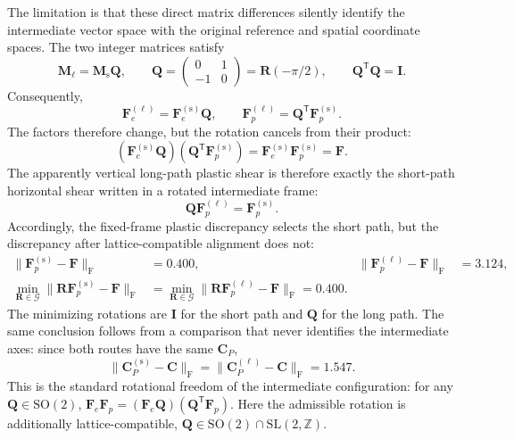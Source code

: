 \documentclass[11pt]{article}
\newcommand{\trans}{\mathsf{T}}
\newcommand{\shortp}{\mathrm{s}}
\newcommand{\longp}{\ell}
\newcommand{\Frob}{\mathrm{F}}
\newcommand{\SO}{\mathrm{SO}(2)}
\newcommand{\SLZ}{\mathrm{SL}(2,\mathbb{Z})}
\begin{document}
The limitation is that these direct matrix differences silently identify the
intermediate vector space with the original reference and spatial coordinate
spaces.  The two integer matrices satisfy
\begin{equation}
 \mathbf M_{\longp}=\mathbf M_{\shortp}\mathbf Q,
 \qquad
 \mathbf Q=
 \begin{pmatrix}0&1\\-1&0\end{pmatrix}
 =\mathbf R(-\pi/2),
 \qquad
 \mathbf Q^\trans\mathbf Q=\mathbf I.
 \label{eq:Qrelation}
\end{equation}
Consequently,
\begin{equation}
 \mathbf F_e^{(\longp)}=\mathbf F_e^{(\shortp)}\mathbf Q,
 \qquad
 \mathbf F_p^{(\longp)}=\mathbf Q^\trans\mathbf F_p^{(\shortp)}.
 \label{eq:gaugepair}
\end{equation}
The factors therefore change, but the rotation cancels from their product:
\begin{equation}
 (\mathbf F_e^{(\shortp)}\mathbf Q)
 (\mathbf Q^\trans\mathbf F_p^{(\shortp)})
 =\mathbf F_e^{(\shortp)}\mathbf F_p^{(\shortp)}=\mathbf F.
\end{equation}
The apparently vertical long-path plastic shear is therefore exactly the
short-path horizontal shear written in a rotated intermediate frame:
\begin{equation}
 \mathbf Q\mathbf F_p^{(\longp)}
 =\mathbf F_p^{(\shortp)}.
 \label{eq:alignplastic}
\end{equation}
Accordingly, the fixed-frame plastic discrepancy selects the short path, but
the discrepancy after lattice-compatible alignment does not:
\begin{align}
 \lVert\mathbf F_p^{(\shortp)}-\mathbf F\rVert_{\Frob}
 &=0.400,
 &
 \lVert\mathbf F_p^{(\longp)}-\mathbf F\rVert_{\Frob}
 &=3.124,
 \\
 \min_{\mathbf R\in\mathcal G}
 \lVert\mathbf R\mathbf F_p^{(\shortp)}-\mathbf F\rVert_{\Frob}
 &=
 \min_{\mathbf R\in\mathcal G}
 \lVert\mathbf R\mathbf F_p^{(\longp)}-\mathbf F\rVert_{\Frob}
 =0.400.
 \label{eq:alignedplasticdistance}
\end{align}
The minimizing rotations are \(\mathbf I\) for the short path and
\(\mathbf Q\) for the long path.  The same conclusion follows from a
comparison that never identifies the intermediate axes: since both routes
have the same \(\mathbf C_P\),
\begin{equation}
 \lVert\mathbf C_P^{(\shortp)}-\mathbf C\rVert_{\Frob}
 =
 \lVert\mathbf C_P^{(\longp)}-\mathbf C\rVert_{\Frob}
 =1.547.
 \label{eq:plasticmetricdistance}
\end{equation}
This is the standard rotational freedom of the intermediate configuration:
for any \(\mathbf Q\in\SO\),
\(
 \mathbf F_e\mathbf F_p
 =(\mathbf F_e\mathbf Q)(\mathbf Q^\trans\mathbf F_p)
\).
Here the admissible rotation is additionally lattice-compatible,
\(\mathbf Q\in\SO\cap\SLZ\).
\end{document}
